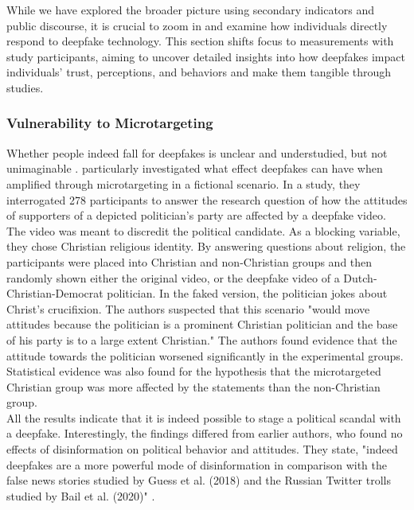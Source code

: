 \documentclass[
  a4paper,  %
  twoside,  %
  bibliography=totoc,
  headsepline,
  cleardoublepage=empty,
  parskip=half,
  draft=false
]{scrbook}
\begin{document}
While we have explored the broader picture using secondary indicators and public discourse, it is crucial to zoom in and examine how individuals directly respond to deepfake technology. This section shifts focus to measurements with study participants, aiming to uncover detailed insights into how deepfakes impact individuals' trust, perceptions, and behaviors and make them tangible through studies.

\subsubsection*{Vulnerability to Microtargeting}
Whether people indeed fall for deepfakes is unclear and understudied, but not unimaginable \cite{dobberMicrotargetedDeepfakesHave2021}. \citet{dobberMicrotargetedDeepfakesHave2021} particularly investigated what effect deepfakes can have when amplified through microtargeting in a fictional scenario. In a study, they interrogated 278 participants to answer the research question of how the attitudes of supporters of a depicted politician's party are affected by a deepfake video. \\
The video was meant to discredit the political candidate. As a blocking variable, they chose Christian religious identity. By answering questions about religion, the participants were placed into Christian and non-Christian groups and then randomly shown either the original video, or the deepfake video of a Dutch-Christian-Democrat politician. In the faked version, the politician jokes about Christ's crucifixion. The authors suspected that this scenario "would move attitudes because the politician is a prominent Christian politician and the base of his party is to a large extent Christian." The authors found evidence that the attitude towards the politician worsened significantly in the experimental groups. Statistical evidence was also found for the hypothesis that the microtargeted Christian group was more affected by the statements than the non-Christian group.\\
All the results indicate that it is indeed possible to stage a political scandal with a deepfake. Interestingly, the findings differed from earlier authors, who found no effects of disinformation on political behavior and attitudes. They state, "indeed deepfakes are a more powerful mode of disinformation in comparison with the false news stories studied by Guess et al. (2018) and the Russian Twitter trolls studied by Bail et al. (2020)" \cite{dobberMicrotargetedDeepfakesHave2021}.
\end{document}
